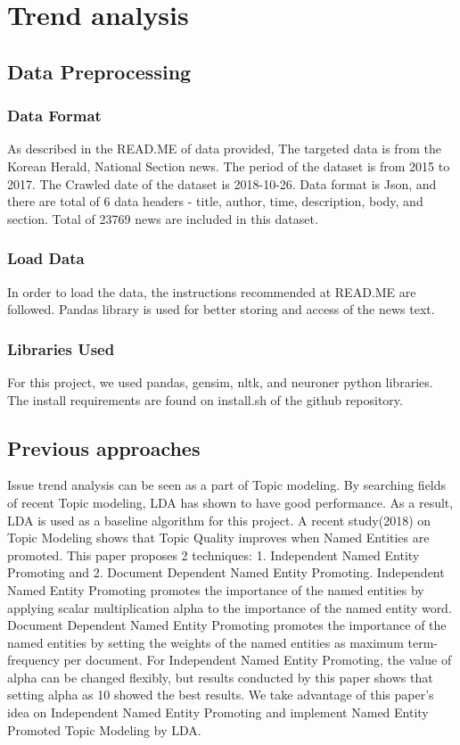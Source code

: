 \section{Trend analysis}

\subsection{Data Preprocessing}
\subsubsection{Data Format}
As described in the READ.ME of data provided, The targeted data is from the Korean Herald, National Section news. The period of the dataset is from 2015 to 2017. The Crawled date of the dataset is 2018-10-26. Data format is Json, and there are total of 6 data headers - title, author, time, description, body, and section. Total of 23769 news are included in this dataset.

\subsubsection{Load Data}
In order to load the data, the instructions recommended at READ.ME are followed. Pandas library is used for better storing and access of the news text.
\subsubsection{Libraries Used}
For this project, we used pandas, gensim, nltk, and neuroner python libraries. The install requirements are found on install.sh of the github repository.


\subsection{Previous approaches}
Issue trend analysis can be seen as a part of Topic modeling. By searching fields of recent Topic modeling, LDA has shown to have good performance. As a result, LDA is used as a baseline algorithm for this project.
A recent study(2018) on Topic Modeling shows that Topic Quality improves when Named Entities are promoted.\cite{krasnashchok-jouili-2018-improving} This paper proposes 2 techniques: 1. Independent Named Entity Promoting and 2. Document Dependent Named Entity Promoting. Independent Named Entity Promoting promotes the importance of the named entities by applying scalar multiplication alpha to the importance of the named entity word. Document Dependent Named Entity Promoting promotes the importance of the named entities by setting the weights of the named entities as maximum term-frequency per document. For Independent Named Entity Promoting, the value of alpha can be changed flexibly, but results conducted by this paper shows that setting alpha as 10 showed the best results.
We take advantage of this paper's idea on Independent Named Entity Promoting and implement Named Entity Promoted Topic Modeling by LDA.
